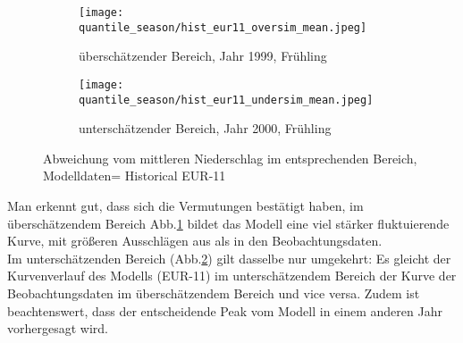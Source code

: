 \begin{figure}[h]
	\begin{subfigure}{0.49\textwidth}
		\texttt{[image: quantile\_season/hist\_eur11\_oversim\_mean.jpeg]}
		\caption{überschätzender Bereich, Jahr 1999, Frühling}
		\label{fig:seasons:hist_eur11:oversim_mean}
	\end{subfigure}
	\begin{subfigure}{0.49\textwidth}
		\texttt{[image: quantile\_season/hist\_eur11\_undersim\_mean.jpeg]}
		\caption{unterschätzender Bereich, Jahr 2000, Frühling}
		\label{fig:seasons:hist_eur11:undersim_mean}
	\end{subfigure}
	\caption{Abweichung vom mittleren Niederschlag im entsprechenden Bereich, Modelldaten= Historical EUR-11}
	\label{fig:seasons:hist_eur11:overundersim_mean}
\end{figure}
Man erkennt gut, dass sich die Vermutungen bestätigt haben, im überschätzendem Bereich Abb.\ref{fig:seasons:hist_eur11:oversim_mean} bildet das Modell eine viel stärker fluktuierende Kurve, mit größeren Ausschlägen aus als in den Beobachtungsdaten.\\
Im unterschätzenden Bereich (Abb.\ref{fig:seasons:hist_eur11:undersim_mean}) gilt dasselbe nur umgekehrt: Es gleicht der Kurvenverlauf des Modells (EUR-11) im unterschätzendem Bereich der Kurve der Beobachtungsdaten im überschätzendem Bereich und vice versa. Zudem ist beachtenswert, dass der entscheidende Peak vom Modell in einem anderen Jahr vorhergesagt wird.\\

